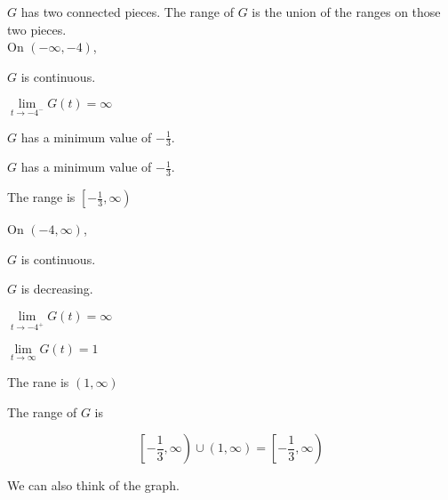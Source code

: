 \documentclass{ximera}
\begin{document}
\begin{explanation}

$G$ has two connected pieces.  The range of $G$ is the union of the ranges on those two pieces. \\





On $( -\infty, -4)$, 

$G$ is continuous.

$\lim\limits_{t \to -4^-} G(t) = \infty$

$G$ has a minimum value of $-\frac{1}{3}$.


$G$ has a minimum value of $-\frac{1}{3}$.

The range is $\left[ -\frac{1}{3}, \infty \right)$






On $(-4, \infty)$, 

$G$ is continuous.

$G$ is decreasing.

$\lim\limits_{t \to -4^+} G(t) = \infty$

$\lim\limits_{t \to \infty} G(t) = 1$

The rane is $(1, \infty)$





The range of $G$ is 

\[
\left[ -\frac{1}{3}, \infty \right) \cup (1, \infty) = \left[ -\frac{1}{3}, \infty \right)
\]






\end{explanation}















We can also think of the graph. \\
\end{document}
